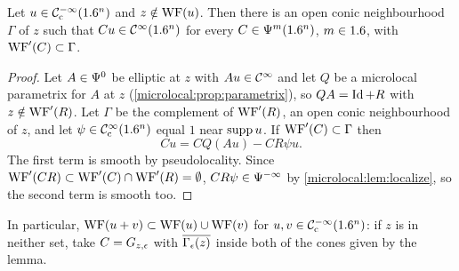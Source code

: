 \begin{lemma}\label{microlocal:lem:wf-cone}
  Let $u\in\mathcal{C}^{-\infty}_{\mathrm{c}}(1.6^n)$ and $z\notin\operatorname{WF}(u)$. Then there is an open conic
  neighbourhood $\Gamma$ of $z$ such that $Cu\in\mathcal{C}^\infty(1.6^n)$ for every
  $C\in\Psi^{m}(1.6^n)$, $m\in1.6$, with $\operatorname{WF}'(C)\subset\Gamma$.
\end{lemma}
\begin{proof}
  Let $A\in\Psi^{0}$ be elliptic at $z$ with $Au\in\mathcal{C}^\infty$ and let $Q$ be a
  microlocal parametrix for $A$ at $z$
  (\cref{microlocal:prop:parametrix}), so $QA=\operatorname{Id}+R$ with $z\notin\operatorname{WF}'(R)$.
  Let $\Gamma$ be the complement of $\operatorname{WF}'(R)$, an open conic neighbourhood of
  $z$, and let $\psi\in\mathcal{C}^\infty_{\mathrm{c}}(1.6^n)$ equal $1$ near $\operatorname{supp} u$. If
  $\operatorname{WF}'(C)\subset\Gamma$ then
  \begin{equation*}
    Cu=CQ(Au)-CR\psi u.
  \end{equation*}
  The first term is smooth by pseudolocality. Since
  $\operatorname{WF}'(CR)\subset\operatorname{WF}'(C)\cap\operatorname{WF}'(R)=\emptyset$,
  $CR\psi\in\Psi^{-\infty}$ by \cref{microlocal:lem:localize}, so the second
  term is smooth too.
\end{proof}

In particular, $\operatorname{WF}(u+v)\subset\operatorname{WF}(u)\cup\operatorname{WF}(v)$ for $u,v\in\mathcal{C}^{-\infty}_{\mathrm{c}}(1.6^n)$:
if $z$ is in neither set, take $C=G_{z,\epsilon}$ with $\overline{\Gamma_\epsilon(z)}$
inside both of the cones given by the lemma.

